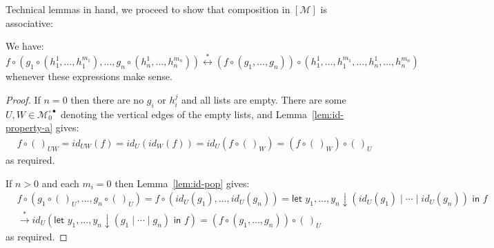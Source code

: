 \documentclass[twoside,11pt,final]{entics}
\newcommand{\ex}[1]{{#1}^{\circ\bullet}}
\newcommand{\asn}{\downarrow}
\newcommand{\seq}{,\!\ldots\!,}
\begin{document}
Technical lemmas in hand, we proceed to show that composition in $[\mathcal{M}]$ is associative:
\begin{lemma}\label{lem:associative}
  We have:
  \[
    f \circ (g_1 \circ (h_1^1 \seq h_1^{m_1}) \seq g_n \circ (h_n^1 \seq h_n^{m_n}))
    \stackrel{*}{\leftrightarrow}
    (f \circ  (g_1 \seq g_n)) \circ (h_1^1\seq h_1^{m_1} \seq h_n^1 \seq h_n^{m_n})
  \]
  whenever these expressions make sense.
\end{lemma}
\begin{proof}
  If $n = 0$ then there are no $g_i$ or $h_i^j$ and all lists are empty. There are some $U,W \in \ex{\mathcal{M}}_0$ denoting the vertical edges of the empty lists, and Lemma~\ref{lem:id-property-a} gives:
  \begin{align*}
    & f \circ (\,)_{UW} = id_{UW}(f) = id_U(id_W(f)) = id_U(f \circ (\,)_W) = (f \circ (\,)_W) \circ (\,)_U
  \end{align*}
  as required. 
  
  If $n > 0$ and each $m_i = 0$ then Lemma~\ref{lem:id-pop} gives:
  \begin{align*}
    & f \circ (g_1 \circ (\,)_U \seq g_n \circ (\,)_U)
      = f \circ (id_U(g_1) \seq id_U(g_n))
      = \textsf{let } y_1\seq y_n \asn (id_U(g_1) \mid \cdots \mid id_U(g_n)) \textsf{ in } f
    \\& \stackrel{*}{\to} id_U(\textsf{let } y_1 \seq y_n \asn (g_1 \mid \cdots \mid g_n) \textsf{ in } f)
    = (f \circ (g_1 \seq g_n)) \circ (\,)_U
  \end{align*}
  as required. 
  

\end{proof}
\end{document}
